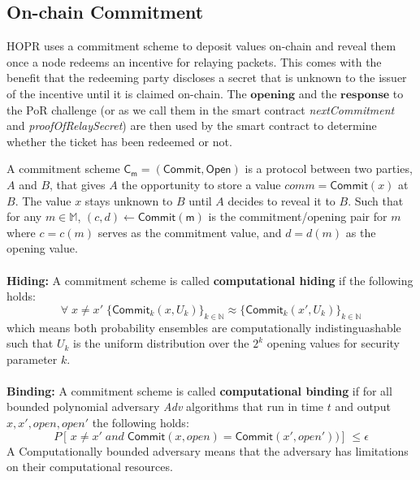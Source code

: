 \subsection{On-chain Commitment}

HOPR uses a commitment scheme to deposit values on-chain and reveal them once a node redeems an incentive for relaying packets. This comes with the benefit that the redeeming party discloses a secret that is unknown to the issuer of the incentive until it is claimed on-chain. The $\textbf{opening}$ and the $\textbf{response}$ to the PoR challenge (or as we call them in the smart contract \textit{nextCommitment} and \textit{proofOfRelaySecret}) are then used by the smart contract to determine whether the ticket has been redeemed or not.

\begin{defnsub}
    A commitment scheme $\mathsf{C_m} = (\mathsf{Commit}, \mathsf{Open})$ is a protocol between two parties, $A$ and $B$, that gives $A$ the opportunity to store a value $comm = \mathsf{Commit}(x)$ at $B$. The value $x$ stays unknown to $B$ until $A$ decides to reveal it to $B$.
    Such that for any $m\in \mathbb{M}$, $(c,d)\leftarrow \mathsf{Commit(m)}$ is the commitment/opening pair for $m$ where $c = c(m)$ serves as the commitment value, and $d = d(m)$ as the opening value.
    \\~\\ \noindent\textbf{Hiding:} A commitment scheme is called \textbf{computational hiding} if the following holds:
    $$\forall \;x\neq x' \; \{\mathsf{Commit}_k(x,U_k)\}_{k\in\mathbb{N}}\approx\{{\mathsf{Commit}_k(x',U_k)}\}_{k\in\mathbb{N}}$$ which means both probability ensembles are computationally indistinguashable such that $U_{k}$ is the uniform distribution over the $2^{k}$ opening values for security parameter $k$.
    \\~\\\noindent\textbf{Binding:} A commitment scheme is called \textbf{computational binding} if for all bounded polynomial adversary \textit{Adv} algorithms that run in time $t$ and output $x,x',open,open'$ the following holds:
    $$P	[ \,x\neq x' \; and \; \mathsf{Commit}(x,open)={\mathsf{Commit}(x',open')})] \,\leq \epsilon$$ A Computationally bounded adversary means that the adversary has limitations on their computational resources. 

\end{defnsub}

